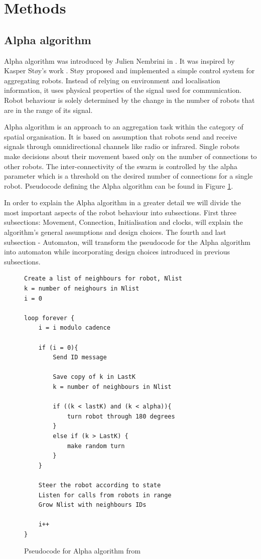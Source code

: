 \section{Methods}


\subsection{Alpha algorithm}
Alpha algorithm was introduced by Julien Nembrini in \cite{Minimalist_Coherent_Swarming_of_Wireless_Networked_Autonomous_Mobile_Robots}. It was inspired by Kasper Støy's work \cite{Using_Situated_Communication_in_Distributed_Autonomous_Mobile_Robotics}. Støy proposed and implemented a simple control system for aggregating robots. Instead of relying on environment and localisation information, it uses physical properties of the signal used for communication. Robot behaviour is solely determined by the change in the number of robots that are in the range of its signal.

Alpha algorithm is an approach to an aggregation task within the category of spatial organisation. It is based on assumption that robots send and receive signals through omnidirectional channels like radio or infrared. Single robots make decisions about their movement based only on the number of connections to other robots. The inter-connectivity of the swarm is controlled by the alpha parameter which is a threshold on the desired number of connections for a single robot. Pseudocode defining the Alpha algorithm can be found in Figure \ref{fig:pseudocode}.

In order to explain the Alpha algorithm in a greater detail we will divide the most important aspects of the robot behaviour into subsections. First three subsections: Movement, Connection, Initialisation and clocks, will explain the algorithm's general assumptions and design choices. The fourth and last subsection - Automaton, will transform the pseudocode for the Alpha algorithm into automaton while incorporating design choices introduced in previous subsections.

\begin{figure}[h!]
\caption{Pseudocode for Alpha algorithm from \cite{Minimalist_Coherent_Swarming_of_Wireless_Networked_Autonomous_Mobile_Robots}}
\begin{lstlisting}
Create a list of neighbours for robot, Nlist
k = number of neighours in Nlist
i = 0

loop forever {
	i = i modulo cadence

	if (i = 0){
		Send ID message

		Save copy of k in LastK
		k = number of neighbours in Nlist

		if ((k < lastK) and (k < alpha)){
			turn robot through 180 degrees
		}
		else if (k > LastK) {
			make random turn
		}
	}

	Steer the robot according to state
	Listen for calls from robots in range
	Grow Nlist with neighbours IDs

	i++
}
\end{lstlisting}
\label{fig:pseudocode}
\end{figure}


